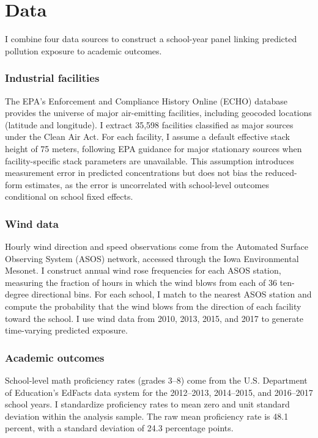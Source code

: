\documentclass[12pt]{article}
\begin{document}
\section{Data}

I combine four data sources to construct a school-year panel linking predicted pollution exposure to academic outcomes.

\subsubsection*{Industrial facilities} The EPA's Enforcement and Compliance History Online (ECHO) database provides the universe of major air-emitting facilities, including geocoded locations (latitude and longitude). I extract 35,598 facilities classified as major sources under the Clean Air Act. For each facility, I assume a default effective stack height of 75 meters, following EPA guidance for major stationary sources when facility-specific stack parameters are unavailable. This assumption introduces measurement error in predicted concentrations but does not bias the reduced-form estimates, as the error is uncorrelated with school-level outcomes conditional on school fixed effects.

\subsubsection*{Wind data} Hourly wind direction and speed observations come from the Automated Surface Observing System (ASOS) network, accessed through the Iowa Environmental Mesonet. I construct annual wind rose frequencies for each ASOS station, measuring the fraction of hours in which the wind blows from each of 36 ten-degree directional bins. For each school, I match to the nearest ASOS station and compute the probability that the wind blows from the direction of each facility toward the school. I use wind data from 2010, 2013, 2015, and 2017 to generate time-varying predicted exposure.

\subsubsection*{Academic outcomes} School-level math proficiency rates (grades 3--8) come from the U.S. Department of Education's EdFacts data system for the 2012--2013, 2014--2015, and 2016--2017 school years. I standardize proficiency rates to mean zero and unit standard deviation within the analysis sample. The raw mean proficiency rate is 48.1 percent, with a standard deviation of 24.3 percentage points.
\end{document}
